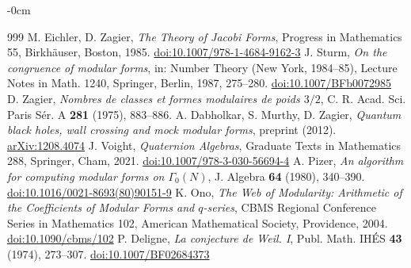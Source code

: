 \documentclass[mathematics,article,submit,pdftex,oneauthor]{Definitions/mdpi}
\numberwithin{equation}{section}
\theoremstyle{plain}
\theoremstyle{remark}
\begin{document}
\begin{adjustwidth}{-\extralength}{0cm}
\begin{thebibliography}{999}
 M. Eichler, D. Zagier, \emph{The Theory of Jacobi Forms}, Progress in Mathematics 55, Birkh\"auser, Boston, 1985. \href{https://doi.org/10.1007/978-1-4684-9162-3}{doi:10.1007/978-1-4684-9162-3}
 J. Sturm, \emph{On the congruence of modular forms}, in: Number Theory (New York, 1984--85), Lecture Notes in Math. 1240, Springer, Berlin, 1987, 275--280. \href{https://doi.org/10.1007/BFb0072985}{doi:10.1007/BFb0072985}
 D. Zagier, \emph{Nombres de classes et formes modulaires de poids $3/2$}, C. R. Acad. Sci. Paris S\'er. A \textbf{281} (1975), 883--886.
 A. Dabholkar, S. Murthy, D. Zagier, \emph{Quantum black holes, wall crossing and mock modular forms}, preprint (2012). \href{https://arxiv.org/abs/1208.4074}{arXiv:1208.4074}
 J. Voight, \emph{Quaternion Algebras}, Graduate Texts in Mathematics 288, Springer, Cham, 2021. \href{https://doi.org/10.1007/978-3-030-56694-4}{doi:10.1007/978-3-030-56694-4}
 A. Pizer, \emph{An algorithm for computing modular forms on $\Gamma_0(N)$}, J. Algebra \textbf{64} (1980), 340--390. \href{https://doi.org/10.1016/0021-8693(80)90151-9}{doi:10.1016/0021-8693(80)90151-9}
 K. Ono, \emph{The Web of Modularity: Arithmetic of the Coefficients of Modular Forms and $q$-series}, CBMS Regional Conference Series in Mathematics 102, American Mathematical Society, Providence, 2004. \href{https://doi.org/10.1090/cbms/102}{doi:10.1090/cbms/102}
 P. Deligne, \emph{La conjecture de Weil. I}, Publ. Math. IH\'ES \textbf{43} (1974), 273--307. \href{https://doi.org/10.1007/BF02684373}{doi:10.1007/BF02684373}
\end{thebibliography}
\PublishersNote{}
\end{adjustwidth}
\end{document}
